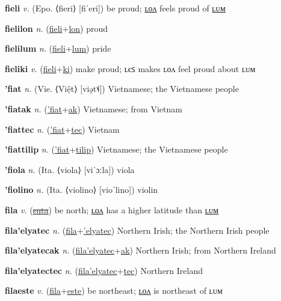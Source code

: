 \textbf{\hypertarget{fieli}{fieli}} \textit{v.} (Epo. ⟨fieri⟩ [fiˈeri])
be proud; \hyperlink{fielilon}{ʟᴏᴧ} feels proud of \hyperlink{fielilum}{ʟᴜᴍ}

\textbf{\hypertarget{fielilon}{fielilon}} \textit{n.} (\hyperlink{fieli}{fieli}+\allowbreak \hyperlink{lon}{lon})
proud

\textbf{\hypertarget{fielilum}{fielilum}} \textit{n.} (\hyperlink{fieli}{fieli}+\allowbreak \hyperlink{lum}{lum})
pride

\textbf{\hypertarget{fieliki}{fieliki}} \textit{v.} (\hyperlink{fieli}{fieli}+\allowbreak \hyperlink{ki}{ki})
make proud; ʟєꜱ makes ʟᴏᴧ feel proud about ʟᴜᴍ

\textbf{\hypertarget{'fiat}{'fiat}} \textit{n.} (Vie. ⟨Việt⟩ [viə̯t˦˨])
Vietnamese; the Vietnamese people

\textbf{\hypertarget{'fiatak}{'fiatak}} \textit{n.} (\hyperlink{'fiat}{'fiat}+\allowbreak \hyperlink{ak}{ak})
Vietnamese; from Vietnam

\textbf{\hypertarget{'fiattec}{'fiattec}} \textit{n.} (\hyperlink{'fiat}{'fiat}+\allowbreak \hyperlink{tec}{tec})
Vietnam

\textbf{\hypertarget{'fiattilip}{'fiattilip}} \textit{n.} (\hyperlink{'fiat}{'fiat}+\allowbreak \hyperlink{tilip}{tilip})
Vietnamese; the Vietnamese people

\textbf{\hypertarget{'fiola}{'fiola}} \textit{n.} (Ita. ⟨viola⟩ [viˈɔːla])
viola

\textbf{\hypertarget{'fiolino}{'fiolino}} \textit{n.} (Ita. ⟨violino⟩ [vioˈlino])
violin

\textbf{\hypertarget{fila}{fila}} \textit{v.} (\hyperlink{suta}{\sout{suta}})
be north; \hyperlink{filalon}{ʟᴏᴧ} has a higher latitude than \hyperlink{filalum}{ʟᴜᴍ}

\textbf{\hypertarget{fila'elyatec}{fila'elyatec}} \textit{n.} (\hyperlink{fila}{fila}+\allowbreak \hyperlink{'elyatec}{'elyatec})
Northern Irish; the Northern Irish people

\textbf{\hypertarget{fila'elyatecak}{fila'elyatecak}} \textit{n.} (\hyperlink{fila'elyatec}{fila'elyatec}+\allowbreak \hyperlink{ak}{ak})
Northern Irish; from Northern Ireland

\textbf{\hypertarget{fila'elyatectec}{fila'elyatectec}} \textit{n.} (\hyperlink{fila'elyatec}{fila'elyatec}+\allowbreak \hyperlink{tec}{tec})
Northern Ireland

\textbf{\hypertarget{filaeste}{filaeste}} \textit{v.} (\hyperlink{fila}{fila}+\allowbreak \hyperlink{este}{este})
be northeast; \hyperlink{filaestelon}{ʟᴏᴧ} is northeast of ʟᴜᴍ

